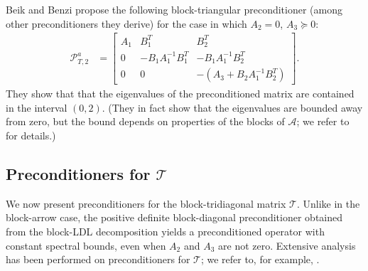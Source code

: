 \documentclass{article}
\newcommand{\sA}{\mathcal{A}}
\newcommand{\sT}{\mathcal{T}}
\begin{document}
Beik and Benzi \cite{bb18} propose the following block-triangular preconditioner (among other preconditioners they derive) for the case in which $A_2 = 0$, $A_3 \succeq 0$:
\begin{align*}
    \mathcal{P}_{T,2}^a &= \begin{bmatrix}
        A_1 & B_1^T & B_2^T \\
        0 & -B_1A_1^{-1}B_1^T & -B_1A_1^{-1}B_2^T \\
        0 & 0 & -(A_3 + B_2A_1^{-1}B_2^T)
    \end{bmatrix}.
\end{align*}
They show that %
that the eigenvalues of %
the preconditioned matrix
are contained in the interval $(0,2)$. (They in fact show that the eigenvalues are bounded away from zero, but the bound depends on  properties of the blocks of $\sA$; we refer to \cite[Theorem 4.7]{bb18} for details.)

\subsection{Preconditioners for $\sT$}
We now present preconditioners for the block-tridiagonal matrix $\sT$. Unlike in the block-arrow case, the positive definite block-diagonal preconditioner obtained from the block-LDL decomposition yields a preconditioned operator with constant spectral bounds, even when $A_2$ and $A_3$ are not zero. Extensive analysis has been performed on preconditioners for $\sT$; we refer to, for example, \cite{bfm25,bmpp24,bg22,cjl21,cmx09,hm19,pp24,sz18}.
\end{document}
